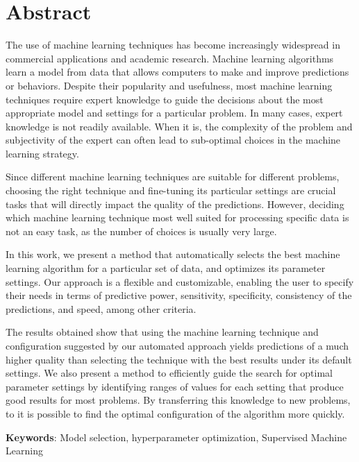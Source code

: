 \cleardoublepage
\chapter*{Abstract}

The use of machine learning techniques has become increasingly widespread in commercial applications and academic research. Machine learning algorithms learn a model from data that allows computers to make and improve predictions or behaviors.  Despite their popularity and usefulness, most machine learning techniques require expert knowledge to guide the decisions about the most appropriate model and settings for a particular problem. In many cases, expert knowledge is not readily available. When it is, the complexity of the problem and subjectivity of the expert can often lead to sub-optimal choices in the machine learning strategy.

\vskip0.2cm
Since different machine learning techniques are suitable for different problems, choosing the right technique and fine-tuning its particular settings are crucial tasks that will directly impact the quality of the predictions. However, deciding which machine learning technique most well suited for processing specific data is not an easy task, as the number of choices is usually very large.

\vskip0.2cm
In this work, we present a method that automatically selects the best machine learning algorithm for a particular set of data, and optimizes its parameter settings. Our approach is a flexible and customizable, enabling the user to specify their needs in terms of predictive power, sensitivity, specificity, consistency of the predictions, and speed, among other criteria.

\vskip0.2cm
The results obtained show that using the machine learning technique and configuration suggested by our automated approach yields predictions of a much higher quality than selecting the technique with the best results under its default settings. We also present a method to efficiently guide the search for optimal parameter settings by identifying ranges of values for each setting that produce good results for most problems. By transferring this knowledge to new problems, to it is possible to find the optimal configuration of the algorithm more quickly.

\vskip0.5cm
{\bf Keywords}:
Model selection, hyperparameter optimization, Supervised Machine Learning
